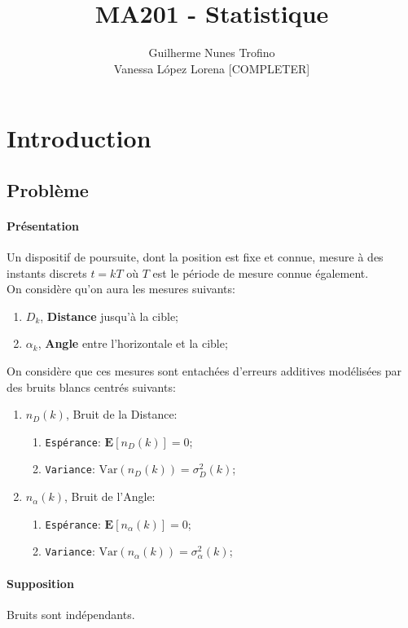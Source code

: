 \documentclass{article}
\title{MA201 - Statistique}
\author{Guilherme Nunes Trofino\\Vanessa López Lorena [COMPLETER]}
\begin{document}
\maketitle

\newpage\tableofcontents

\section*{Introduction}
\subsection*{Problème}
\paragraph{Présentation}Un dispositif de poursuite, dont la position est fixe et connue, mesure à des instants discrets $t = kT$ où $T$ est le période de mesure connue également.\\

\noindent On considère qu'on aura les mesures suivants:
\begin{enumerate}
    \item $D_{k}$, \textbf{Distance} jusqu'à la cible;
    \item $\alpha_{k}$, \textbf{Angle} entre l'horizontale et la cible;
\end{enumerate}
On considère que ces mesures sont entachées d'erreurs additives modélisées par des bruits blancs centrés suivants:
\begin{enumerate}
    \item $n_{D}(k)$, Bruit de la Distance:
    \begin{enumerate}[noitemsep]
        \item \texttt{Espérance}: $\mathbf{E}[n_{D}(k)] = 0$;
        \item \texttt{Variance}: $\text{Var}(n_{D}(k)) = \sigma_{D}^{2}(k)$;
    \end{enumerate}
    \item $n_{\alpha}(k)$, Bruit de l'Angle:
        \begin{enumerate}[noitemsep]
        \item \texttt{Espérance}: $\mathbf{E}[n_{\alpha}(k)] = 0$;
        \item \texttt{Variance}: $\text{Var}(n_{\alpha}(k)) = \sigma_{\alpha}^{2}(k)$;
    \end{enumerate}
\end{enumerate}
\paragraph{Supposition}Bruits sont indépendants.
\end{document}
